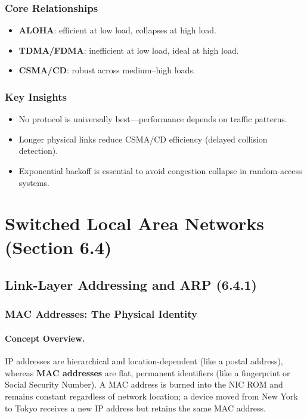 \documentclass[12pt]{article}
\begin{document}
\subsubsection{Core Relationships}

\begin{itemize}
    \item \textbf{ALOHA}: efficient at low load, collapses at high load.
    \item \textbf{TDMA/FDMA}: inefficient at low load, ideal at high load.
    \item \textbf{CSMA/CD}: robust across medium–high loads.
\end{itemize}

\subsubsection{Key Insights}

\begin{itemize}
    \item No protocol is universally best—performance depends on traffic patterns.
    \item Longer physical links reduce CSMA/CD efficiency (delayed collision detection).
    \item Exponential backoff is essential to avoid congestion collapse in random-access systems.
\end{itemize}


\section{Switched Local Area Networks (Section 6.4)}

\subsection{Link-Layer Addressing and ARP (6.4.1)}

\subsubsection{MAC Addresses: The Physical Identity}

\paragraph{Concept Overview.}

IP addresses are hierarchical and location-dependent (like a postal address), whereas
\textbf{MAC addresses} are flat, permanent identifiers (like a fingerprint or Social Security Number).
A MAC address is burned into the NIC ROM and remains constant regardless of network location; a device moved from New York to Tokyo receives a new IP address but retains the same MAC address.
\end{document}
